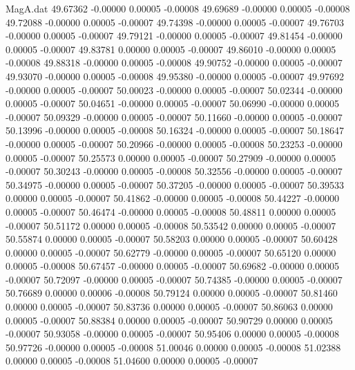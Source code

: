 \begin{filecontents}{MagA.dat}
  49.67362   -0.00000    0.00005   -0.00008
  49.69689   -0.00000    0.00005   -0.00008
  49.72088   -0.00000    0.00005   -0.00007
  49.74398   -0.00000    0.00005   -0.00007
  49.76703   -0.00000    0.00005   -0.00007
  49.79121   -0.00000    0.00005   -0.00007
  49.81454   -0.00000    0.00005   -0.00007
  49.83781    0.00000    0.00005   -0.00007
  49.86010   -0.00000    0.00005   -0.00008
  49.88318   -0.00000    0.00005   -0.00008
  49.90752   -0.00000    0.00005   -0.00007
  49.93070   -0.00000    0.00005   -0.00008
  49.95380   -0.00000    0.00005   -0.00007
  49.97692   -0.00000    0.00005   -0.00007
  50.00023   -0.00000    0.00005   -0.00007
  50.02344   -0.00000    0.00005   -0.00007
  50.04651   -0.00000    0.00005   -0.00007
  50.06990   -0.00000    0.00005   -0.00007
  50.09329   -0.00000    0.00005   -0.00007
  50.11660   -0.00000    0.00005   -0.00007
  50.13996   -0.00000    0.00005   -0.00008
  50.16324   -0.00000    0.00005   -0.00007
  50.18647   -0.00000    0.00005   -0.00007
  50.20966   -0.00000    0.00005   -0.00008
  50.23253   -0.00000    0.00005   -0.00007
  50.25573    0.00000    0.00005   -0.00007
  50.27909   -0.00000    0.00005   -0.00007
  50.30243   -0.00000    0.00005   -0.00008
  50.32556   -0.00000    0.00005   -0.00007
  50.34975   -0.00000    0.00005   -0.00007
  50.37205   -0.00000    0.00005   -0.00007
  50.39533    0.00000    0.00005   -0.00007
  50.41862   -0.00000    0.00005   -0.00008
  50.44227   -0.00000    0.00005   -0.00007
  50.46474   -0.00000    0.00005   -0.00008
  50.48811    0.00000    0.00005   -0.00007
  50.51172    0.00000    0.00005   -0.00008
  50.53542    0.00000    0.00005   -0.00007
  50.55874    0.00000    0.00005   -0.00007
  50.58203    0.00000    0.00005   -0.00007
  50.60428    0.00000    0.00005   -0.00007
  50.62779   -0.00000    0.00005   -0.00007
  50.65120    0.00000    0.00005   -0.00008
  50.67457   -0.00000    0.00005   -0.00007
  50.69682   -0.00000    0.00005   -0.00007
  50.72097   -0.00000    0.00005   -0.00007
  50.74385   -0.00000    0.00005   -0.00007
  50.76689    0.00000    0.00006   -0.00008
  50.79124    0.00000    0.00005   -0.00007
  50.81460    0.00000    0.00005   -0.00007
  50.83736    0.00000    0.00005   -0.00007
  50.86063    0.00000    0.00005   -0.00007
  50.88384    0.00000    0.00005   -0.00007
  50.90729    0.00000    0.00005   -0.00007
  50.93058   -0.00000    0.00005   -0.00007
  50.95406    0.00000    0.00005   -0.00008
  50.97726   -0.00000    0.00005   -0.00008
  51.00046    0.00000    0.00005   -0.00008
  51.02388    0.00000    0.00005   -0.00008
  51.04600    0.00000    0.00005   -0.00007

\end{filecontents}
